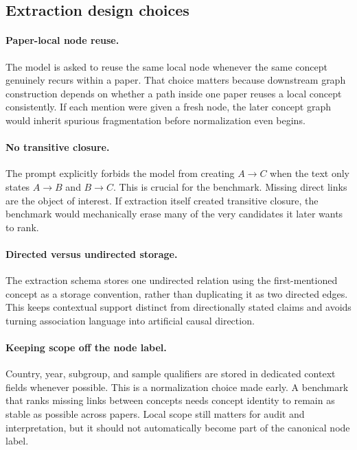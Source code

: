 \documentclass[11pt]{article}
\begin{document}
\subsection{Extraction design choices}

\paragraph{Paper-local node reuse.} The model is asked to reuse the same local node whenever the same concept genuinely recurs within a paper. That choice matters because downstream graph construction depends on whether a path inside one paper reuses a local concept consistently. If each mention were given a fresh node, the later concept graph would inherit spurious fragmentation before normalization even begins.

\paragraph{No transitive closure.} The prompt explicitly forbids the model from creating \(A \rightarrow C\) when the text only states \(A \rightarrow B\) and \(B \rightarrow C\). This is crucial for the benchmark. Missing direct links are the object of interest. If extraction itself created transitive closure, the benchmark would mechanically erase many of the very candidates it later wants to rank.

\paragraph{Directed versus undirected storage.} The extraction schema stores one undirected relation using the first-mentioned concept as a storage convention, rather than duplicating it as two directed edges. This keeps contextual support distinct from directionally stated claims and avoids turning association language into artificial causal direction.

\paragraph{Keeping scope off the node label.} Country, year, subgroup, and sample qualifiers are stored in dedicated context fields whenever possible. This is a normalization choice made early. A benchmark that ranks missing links between concepts needs concept identity to remain as stable as possible across papers. Local scope still matters for audit and interpretation, but it should not automatically become part of the canonical node label.
\end{document}
